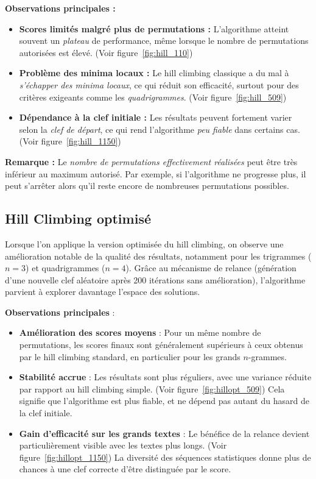 \documentclass[a4paper]{article}
\begin{document}
\textbf{Observations principales :}
\begin{itemize}
  \item \textbf{Scores limités malgré plus de permutations :} L’algorithme atteint souvent un \textit{plateau} de performance, même lorsque le nombre de permutations autorisées est élevé. (Voir figure~\ref{fig:hill_110})
  \item \textbf{Problème des minima locaux :} Le hill climbing classique a du mal à \textit{s’échapper des minima locaux}, ce qui réduit son efficacité, surtout pour des critères exigeants comme les \textit{quadrigrammes}. (Voir figure~\ref{fig:hill_509})
  \item \textbf{Dépendance à la clef initiale :} Les résultats peuvent fortement varier selon la \textit{clef de départ}, ce qui rend l’algorithme \textit{peu fiable} dans certains cas. (Voir figure~\ref{fig:hill_1150})
\end{itemize}

\textbf{Remarque :} Le \textit{nombre de permutations effectivement réalisées} peut être très inférieur au maximum autorisé. Par exemple, si l’algorithme ne progresse plus, il peut s’arrêter alors qu’il reste encore de nombreuses permutations possibles.


\subsection{Hill Climbing optimisé}

Lorsque l’on applique la version optimisée du hill climbing, on observe une amélioration notable de la qualité des résultats, notamment pour les trigrammes ($n=3$) et quadrigrammes ($n=4$). Grâce au mécanisme de relance (génération d’une nouvelle clef aléatoire après 200 itérations sans amélioration), l’algorithme parvient à explorer davantage l’espace des solutions.

\textbf{Observations principales} :
\begin{itemize}
    \item \textbf{Amélioration des scores moyens} : Pour un même nombre de permutations, les scores finaux sont généralement supérieurs à ceux obtenus par le hill climbing standard, en particulier pour les grands $n$-grammes.
    
    \item \textbf{Stabilité accrue} : Les résultats sont plus réguliers, avec une variance réduite par rapport au hill climbing simple. (Voir figure~\ref{fig:hillopt_509}) Cela signifie que l’algorithme est plus fiable, et ne dépend pas autant du hasard de la clef initiale.
    
    \item \textbf{Gain d’efficacité sur les grands textes} : Le bénéfice de la relance devient particulièrement visible avec les textes plus longs. (Voir figure~\ref{fig:hillopt_1150}) La diversité des séquences statistiques donne plus de chances à une clef correcte d’être distinguée par le score.
\end{itemize}
\end{document}
